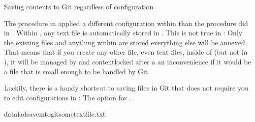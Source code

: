 \ignorespaces \begin{findoutmore}[label={fom-save-to-git}, before title={\thetcbcounter\ }, float, floatplacement=tb, check odd page=true]{Saving contents to Git regardless of configuration}
\label{\detokenize{basics/101-130-yodaproject:fom-save-to-git}}

\sphinxAtStartPar
The  procedure in  applied a different configuration
within  than the  procedure did in .
Within , any text file is automatically stored in {\hyperref[\detokenize{glossary:term-Git}]{}}.
This is not true in : Only the existing  files and
anything within  are stored \textendash{} everything else will be annexed.
That means that if you create any other file, even text files, inside of
 (but not in ), it will be managed by {\hyperref[\detokenize{glossary:term-git-annex}]{}}
and content\sphinxhyphen{}locked after a  \textendash{} an inconvenience if it
would be a file that is small enough to be handled by Git.

\sphinxAtStartPar
Luckily, there is a handy shortcut to saving files in Git that does not
require you to edit configurations in : The 
option for .

\begin{sphinxVerbatim}[commandchars=\\\{\}]
dataladsave\PYGZhy{}m\PYGZhy{}\PYGZhy{}to\PYGZhy{}gitsometextfile.txt
\end{sphinxVerbatim}


\end{findoutmore}


